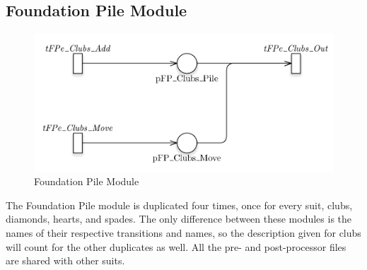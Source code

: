 \documentclass[runningheads,a4paper]{llncs}
\begin{document}
\subsection{Foundation Pile Module}
\begin{figure}
	\begin{center}
		\includegraphics[width=\textwidth]{images/foundationPile}
		\caption{Foundation Pile Module}
	\end{center}
\end{figure}
The Foundation Pile module is duplicated four times, once for every suit, clubs, diamonds, hearts, and spades. The only difference between these modules is the names of their respective transitions and names, so the description given for clubs will count for the other duplicates as well. All the pre- and post-processor files are shared with other suits.
\newline
\end{document}
